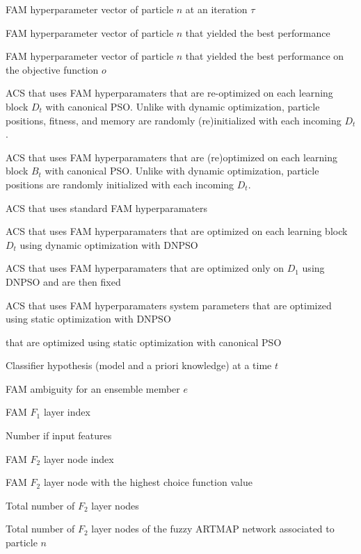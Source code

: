 \item [$\textbf{h}_n(\tau)$] FAM hyperparameter vector of particle $n$ at an iteration $\tau$
\item [$\textbf{h}_n^*$] FAM hyperparameter vector of particle $n$ that yielded the best performance
\item [$\textbf{h}_{n,o}^*$] FAM hyperparameter vector of particle $n$ that yielded the best performance on the objective function $o$
\item [$\textbf{h}_\text{ro}(t)$] ACS that uses FAM hyperparamaters that are re-optimized on each learning block $D_t$ with canonical PSO. Unlike with dynamic optimization, particle positions, fitness, and memory are randomly (re)initialized with each incoming $D_t$.
\item [$\textbf{h}_\text{ro}^B(t)$] ACS that uses FAM hyperparamaters that are (re)optimized on each learning block $B_t$ with canonical PSO. Unlike with dynamic optimization, particle positions are randomly initialized with each incoming $D_t$. 
\item [$\textbf{h}_\text{std}$] ACS that uses standard FAM hyperparamaters
\item [$\textbf{h}_\text{dnc}(t)$] ACS that uses FAM hyperparamaters that are optimized on each learning block $D_t$ using dynamic optimization with DNPSO
\item [$\textbf{h}_\text{dnc}(1)$] ACS that uses FAM hyperparamaters that are optimized only on $D_1$ using DNPSO and are then fixed
\item [$\textbf{h}_\text{stc}(t)$] ACS that uses FAM hyperparamaters system parameters that are optimized  using static optimization with DNPSO
\item [$\textbf{h}_\text{cnl}(t)$] that are optimized using static optimization with canonical PSO
\item [$\textit{hyp}_t$] Classifier hypothesis (model and a priori knowledge) at a time $t$
\item [$\theta_e$] FAM ambiguity for an ensemble member $e$
\item [$i$] FAM $F_1$ layer index
\item [$I$] Number if input features
\item [$j$] FAM $F_2$ layer node index
\item [$j^*$] FAM $F_2$ layer node with the highest choice function value
\item [$J$] Total number of $F_2$ layer nodes
\item [$J_n$] Total number of $F_2$ layer nodes of the fuzzy ARTMAP network associated to particle $n$
